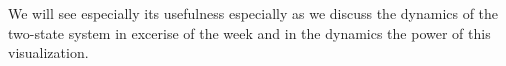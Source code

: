 We will see especially its usefulness especially as we discuss the dynamics of the two-state system in excerise of the week and in the dynamics the power of this visualization.